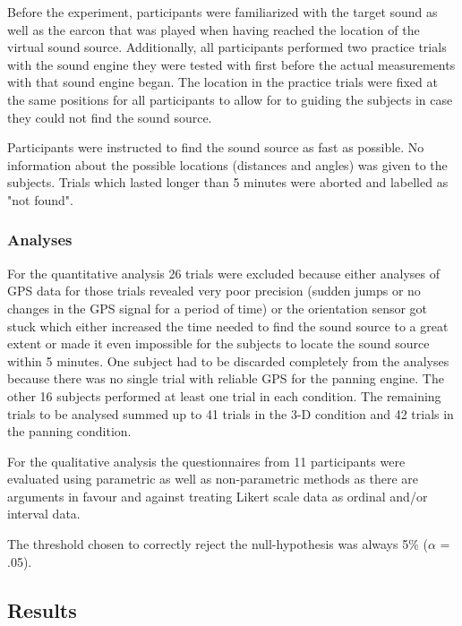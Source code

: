 \documentclass[journal]{IEEEtran}
\begin{document}
Before the experiment, participants were familiarized with the target sound as well as the earcon that was played when having reached the location of the virtual sound source. Additionally, all participants performed two practice trials with the sound engine they were tested with first before the actual measurements with that sound engine began. The location in the practice trials were fixed at the same positions for all participants to allow for to guiding the subjects in case they could not find the sound source. 

Participants were instructed to find the sound source as fast as possible. No information about the possible locations (distances and angles) was given to the subjects. Trials which lasted longer than 5 minutes were aborted and labelled as "not found". 

\subsubsection{Analyses}
For the quantitative analysis 26 trials were excluded because either analyses of GPS data for those trials revealed very poor precision (sudden jumps or no changes in the GPS signal for a period of time) or the orientation sensor got stuck which either increased the time needed to find the sound source to a great extent or made it even impossible for the subjects to locate the sound source within 5 minutes. One subject had to be discarded completely from the analyses because there was no single trial with reliable GPS for the panning engine. The other 16 subjects performed at least one trial in each condition. The remaining trials to be analysed summed up to 41 trials in the 3-D condition and 42 trials in the panning condition.

For the qualitative analysis the questionnaires from 11 participants were evaluated using parametric as well as non-parametric methods as there are arguments in favour \cite{Norman2010, Carifio2007} and against \cite{Kuzon1996} treating Likert scale data as ordinal and/or interval data. 

The threshold chosen to correctly reject the null-hypothesis was always 5\% ($\alpha$ = .05).

\subsection{Results}
\end{document}
